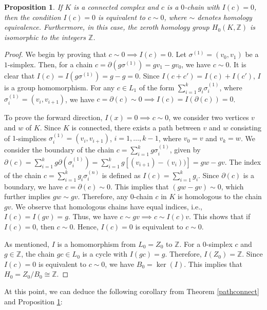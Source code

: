 \documentclass{article}
\newtheorem{proposition}[definition]{Proposition}
\begin{document}
\begin{proposition}
\label{decomposition}
If $K$ is a connected complex and $c$ is a $0$-chain with $I(c) = 0$, then the condition $I(c) = 0$ is equivalent to $c \sim 0$, where $\sim$ denotes homology equivalence. Furthermore, in this case, the zeroth homology group $H_0(K,\mathbb{Z})$ is isomorphic to the integers $\mathbb{Z}$.
\end{proposition}

\begin{proof}
We begin by proving that $c \sim 0 \implies I(c) = 0$. Let $\sigma^{(1)} = (v_0,v_1)$ be a $1$-simplex. Then, for a chain $c = \partial(g\sigma^{(1)}) = gv_1-gv_0$, we have $c \sim 0$. It is clear that $I(c) = I(g\sigma^{(1)}) = g-g = 0$. Since $I(c+c') = I(c) + I(c')$, $I$ is a group homomorphism. For any $c \in L_1$ of the form $\sum_{i=1}^{k} g_i \sigma_i^{(1)}$, where $\sigma_i^{(1)} = (v_i,v_{i+1})$, we have $c = \partial(c) \sim 0 \implies I(c) = I(\partial(c)) = 0$.

To prove the forward direction, $I(x) = 0 \implies c \sim 0$, we consider two vertices $v$ and $w$ of $K$. Since $K$ is connected, there exists a path between $v$ and $w$ consisting of $1$-simplices $\sigma_i^{(1)} = (v_i,v_{i+1})$, $i=1,\ldots,k-1$, where $v_0 = v$ and $v_k = w$. We consider the boundary of the chain $c = \sum_{i=1}^{k} g \sigma_i^{(1)}$, given by $\partial(c) = \sum_{i=1}^{k}g \partial(\sigma_i^{(1)}) = \sum_{i=1}^{k}g [(v_{i+1}) - (v_i))] = gw - gv$. The index of the chain $c = \sum_{i=1}^{k} g_i \sigma_i^{(n)}$ is defined as $I(c) = \sum_{i=1}^{k} g_i$. Since $\partial(c)$ is a boundary, we have $c = \partial(c) \sim 0$. This implies that $(gw-gv) \sim 0$, which further implies $gw \sim gv$. Therefore, any $0$-chain $c$ in $K$ is homologous to the chain $gv$. We observe that homologous chains have equal indices, i.e., $I(c) = I(gv) = g$. Thus, we have $c \sim gv \implies c \sim I(c)v$. This shows that if $I(c) = 0$, then $c \sim 0$. Hence, $I(c) = 0$ is equivalent to $c \sim 0$.

As mentioned, $I$ is a homomorphism from $L_0 = Z_0$ to $\mathbb{Z}$. For a $0$-simplex $c$ and $g \in \mathbb{Z}$, the chain $gc \in L_0$ is a cycle with $I(gc) = g$. Therefore, $I(Z_0) = \mathbb{Z}$. Since $I(c) = 0$ is equivalent to $c \sim 0$, we have $B_0 = \ker(I)$. This implies that $H_0 = Z_0/B_0 \cong \mathbb{Z}$.
\end{proof}

At this point, we can deduce the following corollary from Theorem \ref{pathconnect} and Proposition \ref{decomposition}:
\end{document}
